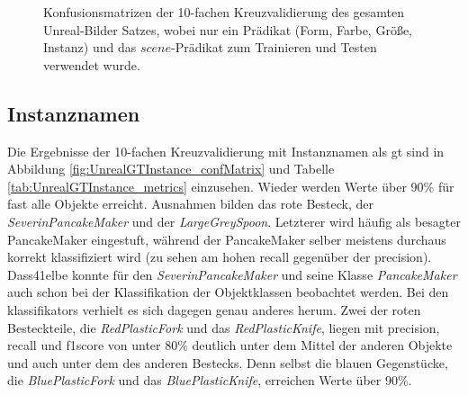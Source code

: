 \begin{figure}
\begin{subfigure}[b]{0.48\textwidth}
	\end{subfigure}
\caption[Konfusionsmatrizen für die Klassifikation mit nur einem Annotatoren Prädikat]{Konfusionsmatrizen der 10-fachen Kreuzvalidierung des gesamten Unreal-Bilder Satzes, wobei nur ein \robosherlock Prädikat (Form, Farbe, Größe, Instanz) und das $scene$-Prädikat zum Trainieren und Testen verwendet wurde.}
\label{fig:singleEvidences}
\end{figure}

\subsection{Instanznamen}

Die Ergebnisse der 10-fachen Kreuzvalidierung mit Instanznamen als \gls{gt} sind in Abbildung \ref{fig:UnrealGTInstance_confMatrix} und Tabelle \ref{tab:UnrealGTInstance_metrics} einzusehen. Wieder werden Werte über 90\% für fast alle Objekte erreicht. Ausnahmen bilden das rote Besteck, der \textit{SeverinPancakeMaker} und der \textit{LargeGreySpoon}. Letzterer wird häufig als besagter PancakeMaker eingestuft, während der PancakeMaker selber meistens durchaus korrekt klassifiziert wird (zu sehen am hohen \gls{recall} gegenüber der \gls{precision}). Dass41elbe konnte für den \textit{SeverinPancakeMaker} und seine Klasse \textit{PancakeMaker} auch schon bei der Klassifikation der Objektklassen beobachtet werden. Bei den \glspl{klassifikator} verhielt es sich dagegen genau anderes herum. Zwei der roten Besteckteile, die \textit{RedPlasticFork} und das \textit{RedPlasticKnife}, liegen mit \gls{precision}, \gls{recall} und \gls{f1score} von unter 80\% deutlich unter dem Mittel der anderen Objekte und auch unter dem des anderen Bestecks. Denn selbst die blauen Gegenstücke, die \textit{BluePlasticFork} und das \textit{BluePlasticKnife}, erreichen Werte über 90\%.

